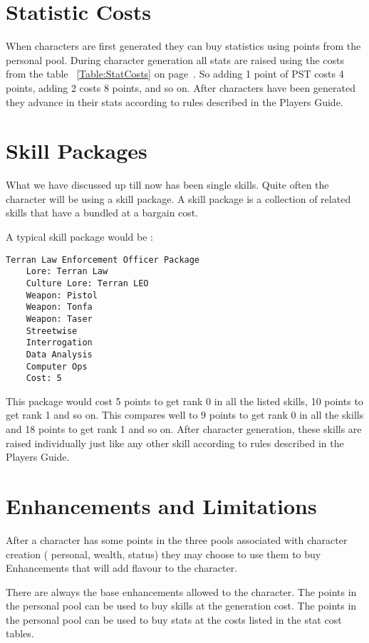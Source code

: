 \section{Statistic Costs}

When characters are first generated they can buy statistics 
using points from the personal pool. During character generation all stats
are raised using the costs from the table ~\ref{Table:StatCosts} on page~\pageref{Table:StatCosts}.
So adding 1 point of PST costs 4 points,  adding 2 costs 8 points, and so
on. After characters have been generated they advance in their stats
according to rules described in the Players Guide.



\section{Skill Packages}

What we have discussed up till now has been single skills.
Quite often the character will be using a skill package.
A skill package is a collection of related skills that have a bundled 
at a bargain cost. 

A typical skill package would be :

\begin{verbatim}
Terran Law Enforcement Officer Package
	Lore: Terran Law
	Culture Lore: Terran LEO
    Weapon: Pistol 
    Weapon: Tonfa
    Weapon: Taser
    Streetwise
    Interrogation
    Data Analysis
    Computer Ops
    Cost: 5
\end{verbatim}

This package would cost 5 points to get rank 0 in all the listed skills, 10
points to get rank 1 and so on. This compares well to 9 points to get rank 0 in all the
skills and 18 points to get rank 1 and so on. After character generation, these skills
are raised individually just like any other skill according to rules
described in the Players Guide.

\section{Enhancements and Limitations}
\label{Sec:Enhancements}
\label{Sec:Limitations}
After a character has some points in the three pools associated with
character creation ( personal, wealth, status) they may choose to
use them to buy Enhancements that will add flavour to the character.

There are always the base enhancements allowed to the character. The
points in the personal pool can be used to buy skills at the generation
cost. The points in the personal pool can be used to buy stats at the costs
listed in the stat cost tables.

